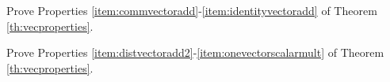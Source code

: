 \documentclass{ximera}
\begin{document}
\begin{problem}\label{prob:vecpropproof1}
Prove Properties \ref{item:commvectoradd}-\ref{item:identityvectoradd} of Theorem \ref{th:vecproperties}.
\end{problem}

\begin{problem}\label{prob:vecpropproof2}
Prove Properties \ref{item:distvectoradd2}-\ref{item:onevectorscalarmult} of Theorem \ref{th:vecproperties}.
\end{problem}
 
\end{document}
